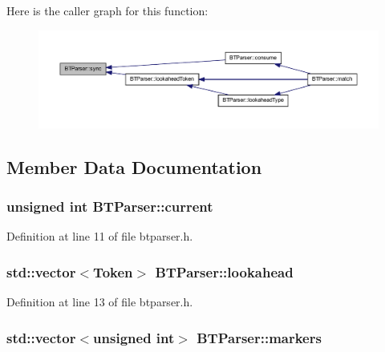 Here is the caller graph for this function:
\nopagebreak
\begin{figure}[H]
\begin{center}
\leavevmode
\includegraphics[width=400pt]{class_b_t_parser_a762e16322aec6e50af51c2b6377d86fe_icgraph}
\end{center}
\end{figure}




\subsection{Member Data Documentation}
\hypertarget{class_b_t_parser_a29930e6537cb65bbefe1962763372165}{
\subsubsection[{current}]{\setlength{\rightskip}{0pt plus 5cm}unsigned int {\bf BTParser::current}}}
\label{class_b_t_parser_a29930e6537cb65bbefe1962763372165}


Definition at line 11 of file btparser.h.

\hypertarget{class_b_t_parser_a796693745ebe354914eeacddba20f109}{
\subsubsection[{lookahead}]{\setlength{\rightskip}{0pt plus 5cm}std::vector$<${\bf Token}$>$ {\bf BTParser::lookahead}}}
\label{class_b_t_parser_a796693745ebe354914eeacddba20f109}


Definition at line 13 of file btparser.h.

\hypertarget{class_b_t_parser_aae8dc94330bb217be99ab2a8f6af005d}{
\subsubsection[{markers}]{\setlength{\rightskip}{0pt plus 5cm}std::vector$<$unsigned int$>$ {\bf BTParser::markers}}}
\label{class_b_t_parser_aae8dc94330bb217be99ab2a8f6af005d}


